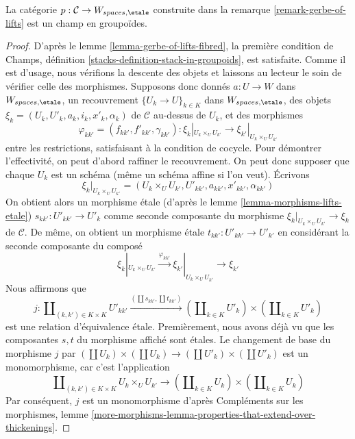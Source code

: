 \begin{lemma}
\label{lemma-gerbe-of-lifts-stack}
La catégorie $p : \mathcal{C} \to W_{spaces, \etale}$ construite
dans la remarque \ref{remark-gerbe-of-lifts} est un champ en groupoïdes.
\end{lemma}

\begin{proof}
D'après le lemme \ref{lemma-gerbe-of-lifts-fibred}, la première condition
de Champs, définition \ref{stacks-definition-stack-in-groupoids}, est satisfaite.
Comme il est d'usage, nous vérifions la descente des objets et laissons au lecteur
le soin de vérifier celle des morphismes. Supposons donc donnés $a : U \to W$
dans $W_{spaces, \etale}$, un recouvrement $\{U_k \to U\}_{k \in K}$ dans
$W_{spaces, \etale}$, des objets $\xi_k = (U_k, U'_k, a_k, i_k, x'_k, \alpha_k)$
de $\mathcal{C}$ au-dessus de $U_k$, et des morphismes
$$
\varphi_{kk'} = (f_{kk'}, f'_{kk'}, \gamma_{kk'}) :
\xi_k|_{U_k \times_U U_{k'}} \to
\xi_{k'}|_{U_k \times_U U_{k'}}
$$
entre les restrictions, satisfaisant à la condition de cocycle. Pour démontrer
l'effectivité, on peut d'abord raffiner le recouvrement. On peut donc supposer que chaque
$U_k$ est un schéma (même un schéma affine si l'on veut). Écrivons
$$
\xi_k|_{U_k \times_U U_{k'}} =
(U_k \times_U U_{k'}, U'_{kk'}, a_{kk'}, x'_{kk'}, \alpha_{kk'})
$$
On obtient alors un morphisme \'etale (d'après le lemme \ref{lemma-morphisms-lifts-etale})
$s_{kk'} : U'_{kk'} \to U'_k$
comme seconde composante du morphisme
$\xi_k|_{U_k \times_U U_{k'}} \to \xi_k$ de $\mathcal{C}$.
De même, on obtient un morphisme \'etale $t_{kk'} : U'_{kk'} \to U'_{k'}$
en considérant la seconde composante du composé
$$
\xi_k|_{U_k \times_U U_{k'}} \xrightarrow{\varphi_{kk'}}
\xi_{k'}|_{U_k \times_U U_{k'}} \to \xi_{k'}
$$
Nous affirmons que
$$
j :
\coprod\nolimits_{(k, k') \in K \times K} U'_{kk'}
\xrightarrow{(\coprod s_{kk'}, \coprod t_{kk'})}
(\coprod\nolimits_{k \in K} U'_k) \times (\coprod\nolimits_{k \in K} U'_k)
$$
est une relation d'équivalence \'etale. Premièrement, nous avons déjà vu
que les composantes $s, t$ du morphisme affiché sont \'etales.
Le changement de base du morphisme $j$ par
$(\coprod U_k) \times (\coprod U_k) \to (\coprod U'_k) \times (\coprod U'_k)$
est un monomorphisme, car c'est l'application
$$
\coprod\nolimits_{(k, k') \in K \times K} U_k \times_U U_{k'}
\longrightarrow
(\coprod\nolimits_{k \in K} U_k) \times (\coprod\nolimits_{k \in K} U_k)
$$
Par conséquent, $j$ est un monomorphisme d'après Compléments sur les morphismes, lemme
\ref{more-morphisms-lemma-properties-that-extend-over-thickenings}.

\end{proof}
